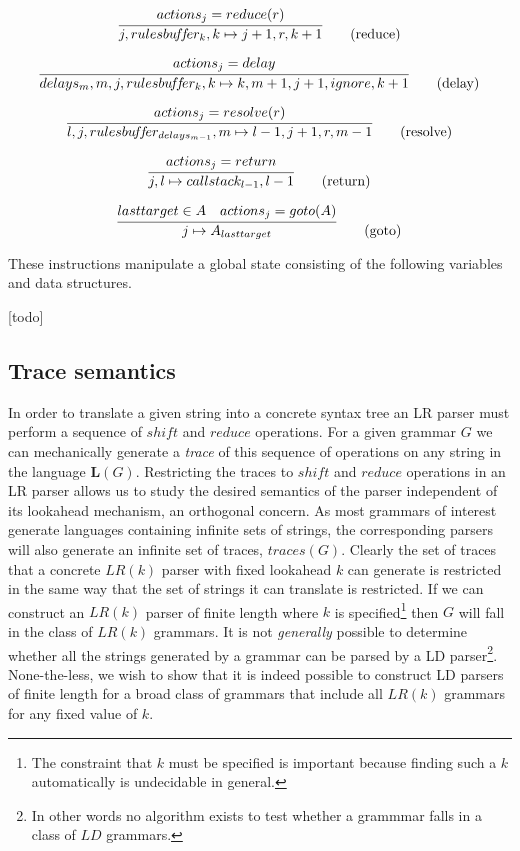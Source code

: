 \documentclass[A4]{sig-alternate}
\begin{document}
\begin{equation}
\infer{j, rulesbu\!f\!f\!er_k, k \mapsto j+1, r, k+1}{actions_j = reduce(r)} \tag{reduce}
\end{equation}

\begin{equation}
\infer{delays_m, m, j, rulesbu\!f\!f\!er_k, k \mapsto k, m+1, j+1, ignore, k+1}{actions_j = delay} \tag{delay}
\end{equation}

\begin{equation}
\infer{l, j, rulesbu\!f\!f\!er_{delays_{m-1}}, m \mapsto l-1, j+1, r, m-1}{actions_j = resolve(r)} \tag{resolve}
\end{equation}

\begin{equation}
\infer{j, l \mapsto callstack_{l-1}, l-1}{actions_j = return} \tag{return}
\end{equation}

\begin{equation}
\infer{j \mapsto A_{lasttarget}}{lasttarget \in A & actions_j = goto(A)} \tag{goto}
\end{equation}

These instructions manipulate a global state consisting of the following variables and data structures.

[todo]

\subsection{Trace semantics}

In order to translate a given string into a concrete syntax tree an LR parser must perform a sequence of $shi\!ft$ and $reduce$ operations.
For a given grammar $G$ we can mechanically generate a \emph{trace} of this sequence of operations on any string in the language $\boldsymbol{L}(G)$.
Restricting the traces to $shi\!ft$ and $reduce$ operations in an LR parser allows us to study the desired semantics of the parser independent of its lookahead mechanism, an orthogonal concern.
As most grammars of interest generate languages containing infinite sets of strings, the corresponding parsers will also generate an infinite set of traces, $traces(G)$.
Clearly the set of traces that a concrete $LR(k)$ parser with fixed lookahead $k$ can generate is restricted in the same way that the set of strings it can translate is restricted.
If we can construct an $LR(k)$ parser of finite length where $k$ is specified\footnote{The constraint that $k$ must be specified is important because finding such a $k$ automatically is undecidable in general.}
then $G$ will fall in the class of $LR(k)$ grammars.
It is not \emph{generally} possible to determine whether all the strings generated by a grammar can be parsed by a LD parser\footnote{In other words no algorithm exists to test whether a grammmar falls in a class of $LD$ grammars.}.
None-the-less, we wish to show that it is indeed possible to construct LD parsers of finite length for a broad class of grammars that include all $LR(k)$ grammars for any fixed value of $k$.
\end{document}
